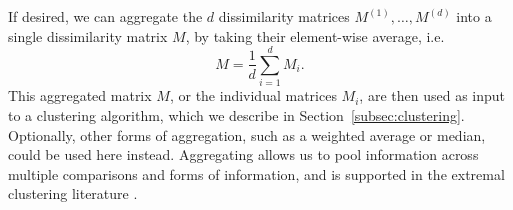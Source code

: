 \documentclass[12pt]{article}
\newcommand{\JSGa}{\mathop{\mathrm{JS}^{\mathrm{G}_{\lambda}}}\nolimits}
\begin{document}
If desired, we can aggregate the $d$ dissimilarity matrices $M^{(1)}, \ldots, M^{(d)}$ into a single dissimilarity matrix $M$, by taking their element-wise average, i.e. 
\begin{equation} \label{eq:aggregate_matrix}
  M = \frac{1}{d} \sum_{i=1}^d M_i.
\end{equation}
This aggregated matrix $M$, or the individual matrices $M_i$, are then used as input to a clustering algorithm, which we describe in Section~\ref{subsec:clustering}.
Optionally, other forms of aggregation, such as a weighted average or median, could be used here instead. 
Aggregating allows us to pool information across multiple comparisons and forms of information, and is supported in the extremal clustering literature \citep{Mornet2017-is}.

\end{document}

